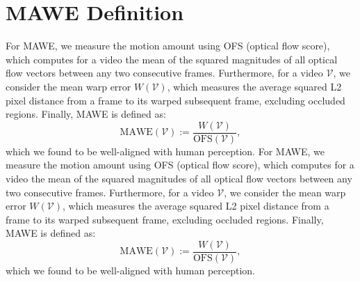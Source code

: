 \section{MAWE Definition}
\label{sec:appendix.MAWE}
For MAWE, we measure the motion amount using OFS (optical flow score), which computes for a video the mean of the squared magnitudes of all optical flow vectors between any two consecutive frames. 
Furthermore, for a video $\mathcal{V}$, we consider the mean warp error \cite{lai2018warp_error_metric}  $W(\mathcal{V}) $, which measures 
the average squared L2 pixel distance from a frame to its warped subsequent frame, excluding occluded regions.  
Finally, MAWE is defined as:
\begin{equation}
    \mathrm{MAWE}(\mathcal{V}) := \frac{W(\mathcal{V})}{  \mathrm{OFS}(\mathcal{V})},
\end{equation}
which we found to be well-aligned with human perception.
For MAWE, we measure the motion amount using OFS (optical flow score), which computes for a video the mean of the squared magnitudes of all optical flow vectors between any two consecutive frames. 
Furthermore, for a video $\mathcal{V}$, we consider the mean warp error \cite{lai2018warp_error_metric}  $W(\mathcal{V}) $, which measures 
the average squared L2 pixel distance from a frame to its warped subsequent frame, excluding occluded regions.  
Finally, MAWE is defined as:
\begin{equation}
    \mathrm{MAWE}(\mathcal{V}) := \frac{W(\mathcal{V})}{  \mathrm{OFS}(\mathcal{V})},
\end{equation}
which we found to be well-aligned with human perception.